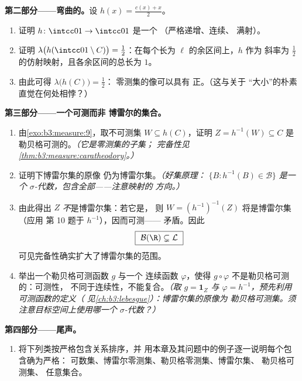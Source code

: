 \begin{problem}
\medskip
\noindent\textbf{第二部分——弯曲的。}设
$h(x) = \frac{c(x) + x}{2}$。
\begin{enumerate}[resume]
  \item 证明 $h \colon \intcc01 \to \intcc01$ 是一个
        （严格递增、连续、
        满射）。
  \item 证明 $\lambda\bigl(h(\intcc01\setminus C)\bigr) =
        \tfrac12$：在每个长为 $\ell$ 的余区间上，$h$ 作为
        斜率为 $\tfrac12$ 的仿射映射，且各余区间的总长为
        $1$。
  \item 由此可得 $\lambda\bigl(h(C)\bigr) = \tfrac12$：
        零测集的像可以具有
        正。（这与关于
        “大小”的朴素直觉在何处相悖？）
\end{enumerate}

\medskip
\noindent\textbf{第三部分——一个可测而非
博雷尔的集合。}
\begin{enumerate}[resume]
  \item 由\cref{exo:b3:measure:9}，取不可测集 $W
        \subseteq h(C)$，证明 $Z = h^{-1}(W) \subseteq C$
        是勒贝格可测的。\emph{（它是零测集的子集；
        完备性见\cref{thm:b3:measure:caratheodory}。）}
  \item 证明下博雷尔集的原像
        仍为博雷尔集。\emph{（好集原理：
        $\{B : h^{-1}(B) \in \mathcal B\}$ 是一个
        $\sigma$-代数，包含全部——注意映射的
        方向。）}
  \item 由此得出 $Z$ \emph{不}是博雷尔集：若它是，
        则 $W = (h^{-1})^{-1}(Z)$ 将是博雷尔集（应用
        第 10 题于 $h^{-1}$），因而可测——
        矛盾。因此
        \[
        \boxed{\ \mathcal B(\R) \subsetneq \mathcal L\ }
        \]
        可见完备性确实扩大了博雷尔集的范围。
  \item 举出一个勒贝格可测函数 $g$ 与一个
        连续函数 $\varphi$，使得 $g \circ
        \varphi$ 不是勒贝格可测的：可测性，
        不同于连续性，不能复合。\emph{（取 $g =
        \mathbf 1_Z$ 与 $\varphi = h^{-1}$，预先利用
        可测函数的定义（
        见\cref{ch:b3:lebesgue}）：博雷尔集的原像为
        勒贝格可测集。须注意目标空间上使用哪一个
        $\sigma$-代数？）}
\end{enumerate}

\medskip
\noindent\textbf{第四部分——尾声。}
\begin{enumerate}[resume]
  \item 将下列类按严格包含关系排序，并
        用本章及其问题中的例子逐一说明每个包含确为严格：
        可数集、博雷尔零测集、勒贝格零测集、博雷尔集、
        勒贝格可测集、
        任意集合。
\end{enumerate}


\end{problem}
